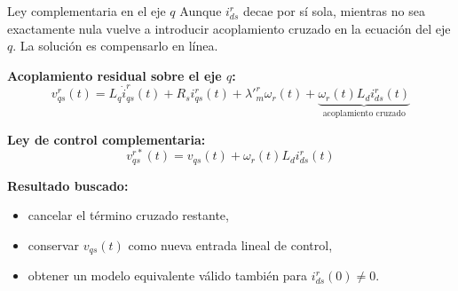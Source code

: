 \documentclass[aspectratio=169,t]{beamer}
\begin{document}
\begin{frame}{Ley complementaria en el eje $q$}
{\small\color{uncGray}Aunque $i_{ds}^{r}$ decae por sí sola, mientras no sea exactamente nula vuelve a introducir acoplamiento cruzado en la ecuación del eje $q$. La solución es compensarlo en línea.}\par
\vspace{3mm}

\textbf{Acoplamiento residual sobre el eje $q$:}
\begin{equation*}
v_{qs}^{r}(t)=L_q\dot{i}_{qs}^{r}(t)+R_s i_{qs}^{r}(t)+\lambda'^r_m\omega_r(t)+
\underbrace{\omega_r(t)L_d i_{ds}^{r}(t)}_{\text{acoplamiento cruzado}}
\end{equation*}

\textbf{Ley de control complementaria:}
\begin{equation*}
\boxed{\;v_{qs}^{r*}(t)=v_{qs}(t)+\omega_r(t)L_d i_{ds}^{r}(t)\;}
\end{equation*}

\textbf{Resultado buscado:}
\begin{itemize}
  \item cancelar el término cruzado restante,
  \item conservar $v_{qs}(t)$ como nueva entrada lineal de control,
  \item obtener un modelo equivalente válido también para $i_{ds}^{r}(0)\neq 0$.
\end{itemize}
\end{frame}
\end{document}

